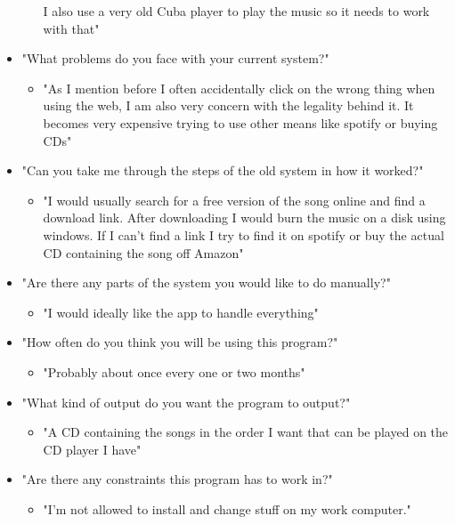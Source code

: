 \documentclass{article}
\begin{document}
\begin{itemize}
\begin{itemize}
            I also use a very old Cuba player to play the music so it needs to work with that"
    \end{itemize}
    \item "What problems do you face with your current system?"
    \begin{itemize}
        \item "As I mention before I often accidentally click on the wrong thing when using the web, I am also very concern with
            the legality behind it. It becomes very expensive trying to use other means like spotify or buying CDs"
    \end{itemize}
    \item "Can you take me through the steps of the old system in how it worked?"
    \begin{itemize}
        \item "I would usually search for a free version of the song online and find a download link. After downloading
            I would burn the music on a disk using windows. If I can't find a link I try to find it on spotify or
            buy the actual CD containing the song off Amazon"
    \end{itemize}
    \item "Are there any parts of the system you would like to do manually?"
    \begin{itemize}
        \item "I would ideally like the app to handle everything"
    \end{itemize}
    \item "How often do you think you will be using this program?"
    \begin{itemize}
        \item "Probably about once every one or two months"
    \end{itemize}
    \item "What kind of output do you want the program to output?"
    \begin{itemize}
        \item "A CD containing the songs in the order I want that can be played on the CD player I have"
    \end{itemize}
    \item "Are there any constraints this program has to work in?"
    \begin{itemize}
        \item "I'm not allowed to install and change stuff on my work computer."
    \end{itemize}

\end{itemize}
\end{document}
